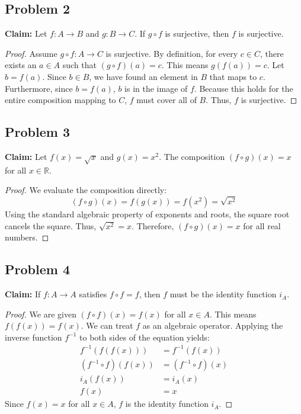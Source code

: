 \documentclass[11pt, a4paper]{article}
\theoremstyle{definition}
\theoremstyle{remark}
\newcommand{\R}{\mathbb{R}}
\begin{document}
\subsection*{Problem 2}
\textbf{Claim:} Let $f: A \to B$ and $g: B \to C$. If $g \circ f$ is surjective, then $f$ is surjective.
\begin{proof}
Assume $g \circ f: A \to C$ is surjective. By definition, for every $c \in C$, there exists an $a \in A$ such that $(g \circ f)(a) = c$. This means $g(f(a)) = c$. Let $b = f(a)$. Since $b \in B$, we have found an element in $B$ that maps to $c$. Furthermore, since $b = f(a)$, $b$ is in the image of $f$. Because this holds for the entire composition mapping to $C$, $f$ must cover all of $B$. Thus, $f$ is surjective.
\end{proof}

\subsection*{Problem 3}
\textbf{Claim:} Let $f(x) = \sqrt{x}$ and $g(x) = x^2$. The composition $(f \circ g)(x) = x$ for all $x \in \R$.
\begin{proof}
We evaluate the composition directly:
\[ (f \circ g)(x) = f(g(x)) = f(x^2) = \sqrt{x^2} \]
Using the standard algebraic property of exponents and roots, the square root cancels the square. Thus, $\sqrt{x^2} = x$. Therefore, $(f \circ g)(x) = x$ for all real numbers.
\end{proof}

\subsection*{Problem 4}
\textbf{Claim:} If $f: A \to A$ satisfies $f \circ f = f$, then $f$ must be the identity function $i_A$.
\begin{proof}
We are given $(f \circ f)(x) = f(x)$ for all $x \in A$. This means $f(f(x)) = f(x)$. We can treat $f$ as an algebraic operator. Applying the inverse function $f^{-1}$ to both sides of the equation yields:
\begin{align*}
    f^{-1}(f(f(x))) &= f^{-1}(f(x)) \\
    (f^{-1} \circ f)(f(x)) &= (f^{-1} \circ f)(x) \\
    i_A(f(x)) &= i_A(x) \\
    f(x) &= x
\end{align*}
Since $f(x) = x$ for all $x \in A$, $f$ is the identity function $i_A$.
\end{proof}
\end{document}
